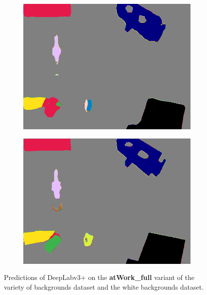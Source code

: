 \begin{figure}[h]
\begin{subfigure}{.24\textwidth}
			\includegraphics[width=1\linewidth]{images/sample_predictions/00017_mob_full_pred}
		\end{subfigure}
		\begin{subfigure}{.24\textwidth}
			\centering
			\includegraphics[width=1\linewidth]{images/sample_predictions/00017_xcep_full_pred}
		\end{subfigure}
		\caption{Predictions of DeepLabv3+ on the \textbf{atWork\_full} variant of the variety of backgrounds dataset and the white backgrounds dataset.}
		\label{Fig:sam_full}
	\end{figure}
	
